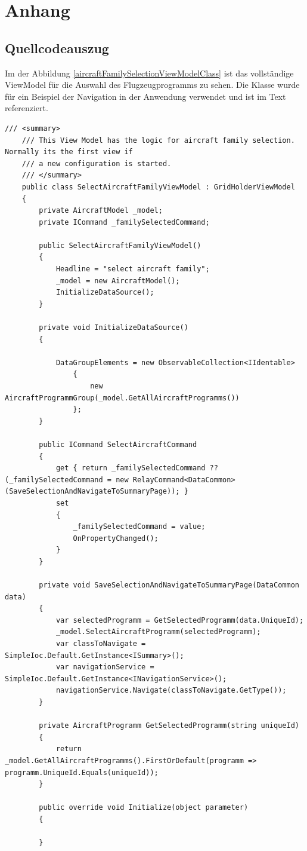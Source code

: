\chapter{Anhang}


\section{Quellcodeauszug}
Im der Abbildung \ref{aircraftFamilySelectionViewModelClass} ist das vollständige ViewModel für die Auswahl des Flugzeugprogramms zu sehen. Die Klasse wurde für ein Beispiel der Navigation in der Anwendung verwendet und ist im Text referenziert.

\begin{lstlisting}[caption=Vollständige SelectAircraftFamilyViewModel Klasse für die Flugzeugprogrammauswahl]
/// <summary>
    /// This View Model has the logic for aircraft family selection. Normally its the first view if
    /// a new configuration is started.
    /// </summary>
    public class SelectAircraftFamilyViewModel : GridHolderViewModel
    {
        private AircraftModel _model;
        private ICommand _familySelectedCommand;

        public SelectAircraftFamilyViewModel()
        {
            Headline = "select aircraft family";
            _model = new AircraftModel();
            InitializeDataSource();
        }

        private void InitializeDataSource()
        {

            DataGroupElements = new ObservableCollection<IIdentable>
                {
                    new AircraftProgrammGroup(_model.GetAllAircraftProgramms())
                }; 
        }

        public ICommand SelectAircraftCommand
        {
            get { return _familySelectedCommand ?? (_familySelectedCommand = new RelayCommand<DataCommon>(SaveSelectionAndNavigateToSummaryPage)); }
            set
            {
                _familySelectedCommand = value;
                OnPropertyChanged();
            }
        }

        private void SaveSelectionAndNavigateToSummaryPage(DataCommon data)
        {
            var selectedProgramm = GetSelectedProgramm(data.UniqueId);
            _model.SelectAircraftProgramm(selectedProgramm);
            var classToNavigate = SimpleIoc.Default.GetInstance<ISummary>();
            var navigationService = SimpleIoc.Default.GetInstance<INavigationService>();
            navigationService.Navigate(classToNavigate.GetType());
        }

        private AircraftProgramm GetSelectedProgramm(string uniqueId)
        {
            return _model.GetAllAircraftProgramms().FirstOrDefault(programm => programm.UniqueId.Equals(uniqueId));
        }

        public override void Initialize(object parameter)
        {
            
        }
\end{lstlisting} 
\label{aircraftFamilySelectionViewModelClass}

